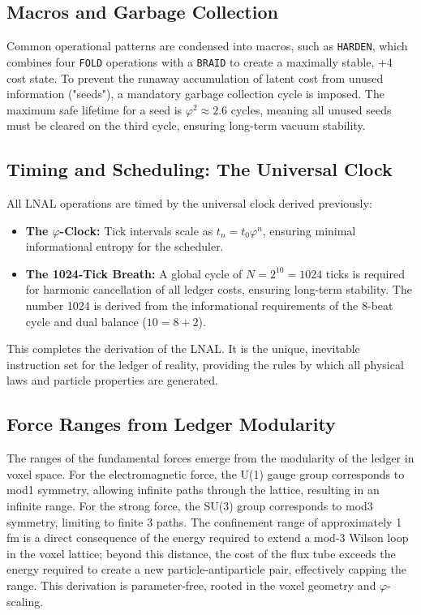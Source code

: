 \subsection{Macros and Garbage Collection}
Common operational patterns are condensed into macros, such as \texttt{HARDEN}, which combines four \texttt{FOLD} operations with a \texttt{BRAID} to create a maximally stable, +4 cost state. To prevent the runaway accumulation of latent cost from unused information ("seeds"), a mandatory garbage collection cycle is imposed. The maximum safe lifetime for a seed is \(\varphi^2 \approx 2.6\) cycles, meaning all unused seeds must be cleared on the third cycle, ensuring long-term vacuum stability.

\subsection{Timing and Scheduling: The Universal Clock}
All LNAL operations are timed by the universal clock derived previously:
\begin{itemize}
    \item \textbf{The \(\varphi\)-Clock:} Tick intervals scale as \(t_n = t_0 \varphi^n\), ensuring minimal informational entropy for the scheduler.
    \item \textbf{The 1024-Tick Breath:} A global cycle of \(N=2^{10}=1024\) ticks is required for harmonic cancellation of all ledger costs, ensuring long-term stability. The number 1024 is derived from the informational requirements of the 8-beat cycle and dual balance (\(10=8+2\)).
\end{itemize}
This completes the derivation of the LNAL. It is the unique, inevitable instruction set for the ledger of reality, providing the rules by which all physical laws and particle properties are generated.

\subsection{Force Ranges from Ledger Modularity}
The ranges of the fundamental forces emerge from the modularity of the ledger in voxel space. For the electromagnetic force, the U(1) gauge group corresponds to mod1 symmetry, allowing infinite paths through the lattice, resulting in an infinite range. For the strong force, the SU(3) group corresponds to mod3 symmetry, limiting to finite 3 paths. The confinement range of approximately 1 fm is a direct consequence of the energy required to extend a mod-3 Wilson loop in the voxel lattice; beyond this distance, the cost of the flux tube exceeds the energy required to create a new particle-antiparticle pair, effectively capping the range. This derivation is parameter-free, rooted in the voxel geometry and \(\varphi\)-scaling.

